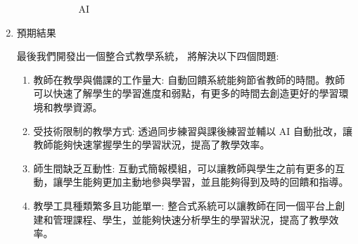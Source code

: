 \documentclass[12pt]{article}
\begin{document}
\begin{enumerate}
\begin{enumerate}
\begin{enumerate}[label=(\arabic*)]
\begin{figure}[htbp]
              \caption{AI}
              \label{ai}
            \end{figure}
        \end{enumerate}

    \end{enumerate}

  \item 預期結果
    \par 最後我們開發出一個整合式教學系統，
    將解決以下四個問題:
    \begin{enumerate}
      \item 教師在教學與備課的工作量大: 自動回饋系統能夠節省教師的時間。教師可以快速了解學生的學習進度和弱點，有更多的時間去創造更好的學習環境和教學資源。
      \item 受技術限制的教學方式: 透過同步練習與課後練習並輔以 AI 自動批改，讓教師能夠快速掌握學生的學習狀況，提高了教學效率。
      \item 師生間缺乏互動性: 互動式簡報模組，可以讓教師與學生之前有更多的互動，讓學生能夠更加主動地參與學習，並且能夠得到及時的回饋和指導。
      \item 教學工具種類繁多且功能單一: 整合式系統可以讓教師在同一個平台上創建和管理課程、學生，並能夠快速分析學生的學習狀況，提高了教學效率。
    \end{enumerate}


\end{enumerate}
\end{document}
